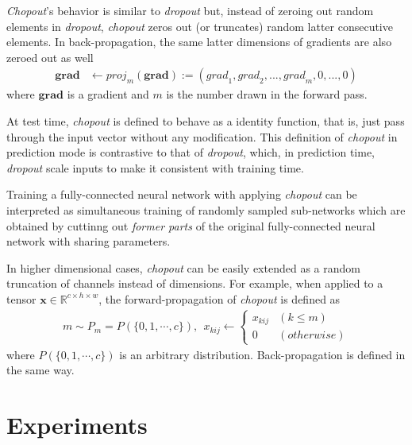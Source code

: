 \documentclass{article}
\begin{document}
    \textit{Chopout}'s behavior is similar to \textit{dropout} but, instead of zeroing out random elements in \textit{dropout}, \textit{chopout} zeros out (or truncates) random latter consecutive elements. In back-propagation, the same latter dimensions of gradients are also zeroed out as well
    \begin{align}
        \mathbf{grad} &\leftarrow {proj}_m(\mathbf{grad}) := ({grad}_1, {grad}_2, ..., {grad}_m, 0, ..., 0) \nonumber
    \end{align}    
    where $\mathbf{grad}$ is a gradient and $m$ is the number drawn in the forward pass. 
    
    At test time, \textit{chopout} is defined to behave as a identity function, that is, just pass through the input vector without any modification. This definition of \textit{chopout} in prediction mode is contrastive to that of \textit{dropout}, which, in prediction time, \textit{dropout} scale inputs to make it consistent with training time.
    
    Training a fully-connected neural network with applying \textit{chopout} can be interpreted as simultaneous training of randomly sampled sub-networks which are obtained by cuttinng out \textit{former parts} of the original fully-connected neural network with sharing parameters.

    In higher dimensional cases, \textit{chopout} can be easily extended as a random truncation of channels instead of dimensions.  For example, when applied to a tensor $\mathbf{x} \in \mathbb{R}^{c \times h \times w}$, the forward-propagation of \textit{chopout} is defined as
    \begin{align}
        m \sim P_m = P(\{0, 1, \cdots, c\}), \ \ 
        x_{kij} \leftarrow \begin{cases}
            x_{kij} & (k \leq m) \\
            0 & (otherwise)
            \end{cases} \nonumber
    \end{align}
    where $P(\{0, 1, \cdots, c\})$ is an arbitrary distribution. Back-propagation is defined in the same way.

    \section{Experiments}
    \label{experiments}
    
\end{document}
